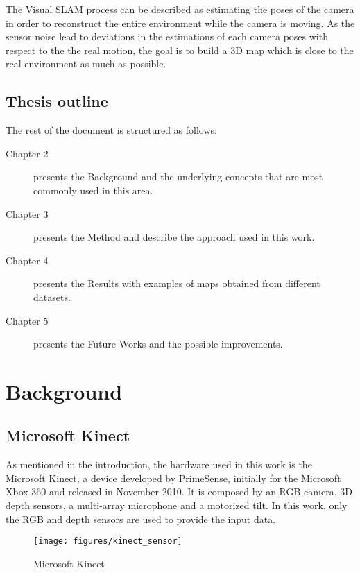 The Visual SLAM process can be described as estimating the poses of the camera in order to reconstruct the entire environment while the camera is moving. As the sensor noise lead to deviations in the estimations of each camera poses with respect to the the real motion, the goal is to build a 3D map which is close to the real environment as much as possible.

\section{Thesis outline}
The rest of the document is structured as follows:
\begin{description}
\item[Chapter 2] presents the Background and the underlying concepts that are most commonly used in this area.
\item[Chapter 3] presents the Method and describe the approach used in this work.
\item[Chapter 4] presents the Results with examples of maps obtained from different datasets.
\item[Chapter 5] presents the Future Works and the possible improvements.
\end{description}

\chapter{Background}

\section{Microsoft Kinect}

As mentioned in the introduction, the hardware used in this work is the Microsoft Kinect, a device developed by PrimeSense, initially for the Microsoft Xbox 360 and released in November 2010. It is composed by an RGB camera, 3D depth sensors, a multi-array microphone and a motorized tilt. In this work, only the RGB and depth sensors are used to provide the input data.

\begin{figure}[h]
\centering
\texttt{[image: figures/kinect\_sensor]}
\caption{Microsoft Kinect}
\end{figure}

